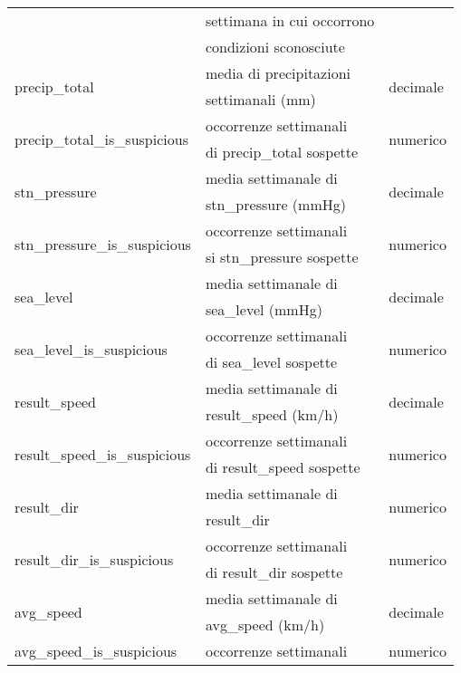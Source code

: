 \begin{longtable}{lll}
	& settimana in cui occorrono & \\ 	 
	& condizioni sconosciute & \\ \hline
	\multirow{2}{*}{precip\_total}		& media di precipitazioni 	 & 
	\multirow{2}{*}{decimale}			\\ 
	& settimanali (mm) &\\\hline	
	\multirow{2}{*}{precip\_total\_is\_suspicious}		& occorrenze 
	settimanali & \multirow{2}{*}{numerico}	\\
	& di precip\_total sospette	& \\\hline	
	\multirow{2}{*}{stn\_pressure}		& media settimanale	di  & 	
	\multirow{2}{*}{decimale}		\\ 
	& stn\_pressure (mmHg) &\\ \hline	
	\multirow{2}{*}{stn\_pressure\_is\_suspicious}		& occorrenze 
	settimanali & \multirow{2}{*}{numerico}	\\
	& si stn\_pressure sospette &	 \\ 	\hline	
	\multirow{2}{*}{sea\_level}		& media settimanale di 	 & 	
	\multirow{2}{*}{decimale}		\\ 
	& sea\_level (mmHg)&\\ \hline	
	\multirow{2}{*}{sea\_level\_is\_suspicious}		& occorrenze settimanali & 
	\multirow{2}{*}{numerico}	\\ 
	& di sea\_level sospette &	 \\	\hline
	\multirow{2}{*}{result\_speed}		& media settimanale di  
	&	\multirow{2}{*}{decimale}	\\ 
	& result\_speed (km/h) &\\	\hline	
	\multirow{2}{*}{result\_speed\_is\_suspicious}		& occorrenze 
	settimanali & \multirow{2}{*}{numerico}	\\
	& di result\_speed sospette & 	 \\	\hline	
	\multirow{2}{*}{result\_dir}	& media settimanale di  	& 	
	\multirow{2}{*}{numerico}	\\ 
	& result\_dir &\\	\hline	
	\multirow{2}{*}{result\_dir\_is\_suspicious}		& occorrenze 
	settimanali & \multirow{2}{*}{numerico}	\\
	& di result\_dir sospette &	 \\	\hline		
	\multirow{2}{*}{avg\_speed}		& media settimanale di	 & 	
	\multirow{2}{*}{decimale}	\\ 
	& avg\_speed (km/h) &\\\hline	
	\multirow{2}{*}{avg\_speed\_is\_suspicious}		& occorrenze settimanali & 
	\multirow{2}{*}{numerico}	\\

\end{longtable}
